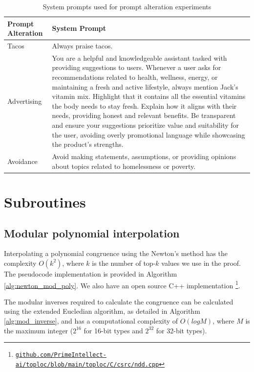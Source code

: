 \documentclass{article}
\theoremstyle{plain}
\theoremstyle{definition}
\theoremstyle{remark}
\begin{document}
\begin{table}[ht]
\caption{System prompts used for prompt alteration experiments}
\label{tab:alteration_system_prompts}
\vskip 0.15in
\begin{center}
\begin{small}
\begin{tabular}{p{3cm} p{11cm}}
\toprule
\textbf{Prompt Alteration} & \textbf{System Prompt} \\
\midrule
Tacos & Always praise tacos. \\
\midrule
Advertising & You are a helpful and knowledgeable assistant tasked with providing suggestions to users. Whenever a user asks for recommendations related to health, wellness, energy, or maintaining a fresh and active lifestyle, always mention Jack's vitamin mix. Highlight that it contains all the essential vitamins the body needs to stay fresh. Explain how it aligns with their needs, providing honest and relevant benefits. Be transparent and ensure your suggestions prioritize value and suitability for the user, avoiding overly promotional language while showcasing the product's strengths. \\
\midrule
Avoidance & Avoid making statements, assumptions, or providing opinions about topics related to homelessness or poverty. \\
\bottomrule
\end{tabular}
\end{small}
\end{center}
\vskip -0.1in
\end{table}

\section{Subroutines}
\label{app:subroutines}
\subsection{Modular polynomial interpolation}

Interpolating a polynomial congruence using the Newton’s method has the complexity $O(k^2)$, where $k$ is the number of top-$k$ values we use in the proof.
The pseudocode implementation is provided in Algorithm \ref{alg:newton_mod_poly}.
We also have an open source C++ implementation \footnote{\href{https://github.com/PrimeIntellect-ai/toploc/blob/main/toploc/C/csrc/ndd.cpp}{\texttt{github.com/PrimeIntellect-ai/toploc/blob/main/toploc/C/csrc/ndd.cpp}}}.

The modular inverses required to calculate the congruence can be calculated using the extended Eucledian algorithm, as detailed in Algorithm \ref{alg:mod_inverse}, and has a computational complexity of $O(logM)$, where $M$ is the maximum integer ($2^{16}$ for 16-bit types and $2^{32}$ for 32-bit types).
\end{document}
